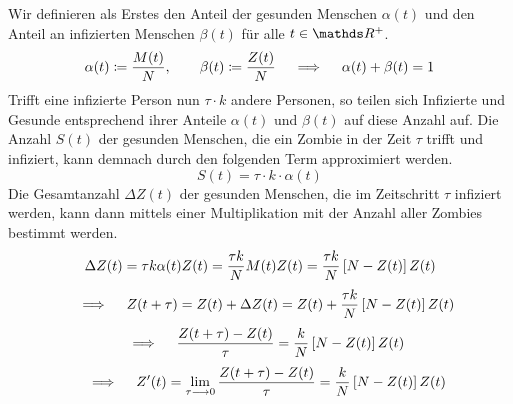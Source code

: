 \begin{atiSolution}
	\begin{atiSubtaskSolutions}
		\item[\localref{a}]{
			Wir definieren als Erstes den Anteil der gesunden Menschen $\alpha(t)$ und den Anteil an infizierten Menschen $\beta(t)$ für alle $t\in\setR^+$.
			\[
				\alpha(t)\define \frac{M(t)}{N}\separate\beta(t)\define\frac{Z(t)}{N} \implies \alpha(t) + \beta(t) = 1
			\]
			Trifft eine infizierte Person nun $\tau\cdot k$ andere Personen, so teilen sich Infizierte und Gesunde entsprechend ihrer Anteile $\alpha(t)$ und $\beta(t)$ auf diese Anzahl auf.
			Die Anzahl $S(t)$ der gesunden Menschen, die ein Zombie in der Zeit $\tau$ trifft und infiziert, kann demnach durch den folgenden Term approximiert werden.
			\[
				S(t) = \tau\cdot k\cdot \alpha(t)
			\]
			Die Gesamtanzahl $\Delta Z(t)$ der gesunden Menschen, die im Zeitschritt $\tau$ infiziert werden, kann dann mittels einer Multiplikation mit der Anzahl aller Zombies bestimmt werden.
			\[
				\Delta Z(t) = \tau k\alpha(t)Z(t) = \frac{\tau k}{N}M(t)Z(t) = \frac{\tau k}{N} \left[ N-Z(t) \right]Z(t)
			\]
			\[
				\implies Z(t+\tau) = Z(t) + \Delta Z(t) = Z(t) + \frac{\tau k}{N} \boxb{N-Z(t)}Z(t)
			\]
			\[
				\implies \frac{Z(t+\tau)-Z(t)}{\tau} = \frac{k}{N}\boxb{N-Z(t)}Z(t)
			\]
			\[
				\implies Z'(t) = \lim_{\tau\conv 0}\frac{Z(t+\tau)-Z(t)}{\tau} = \frac{k}{N}\boxb{N-Z(t)}Z(t)
			\]
		}
	\end{atiSubtaskSolutions}
\end{atiSolution}